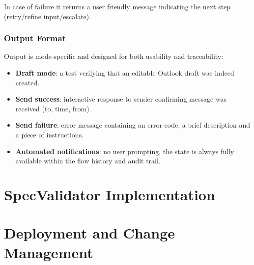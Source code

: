 \noindent In case of failure it returns a user friendly message indicating the next step (retry/refine input/escalate).


\subsubsection{Output Format}

Output is mode-specific and designed for both usability and traceability:

\begin{itemize}
    \item[\quad\textbullet] \textbf{Draft mode}: a test verifying that an editable Outlook draft was indeed created.
    \item[\quad\textbullet] \textbf{Send success}: interactive response to sender confirming message was received (to, time, from).
    \item[\quad\textbullet] \textbf{Send failure}: error message containing an error code, a brief description and a piece of instructions.
    \item[\quad\textbullet] \textbf{Automated notifications}: no user prompting, the state is always fully available within the flow history and audit trail.
\end{itemize}

\section{\textcolor[HTML]{0066CC}{SpecValidator Implementation}}


\section{\textcolor[HTML]{0066CC}{Deployment and Change Management}}

